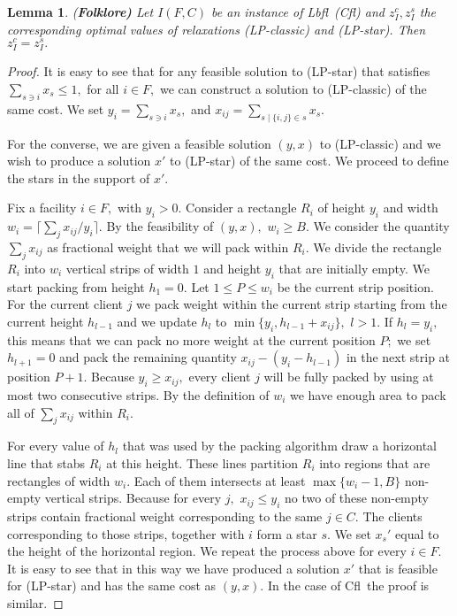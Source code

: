 \documentclass[11pt]{article}\usepackage{amsmath}
\newtheorem{lemma}{Lemma}[section]
\newcommand{\lbfl}{{\sc Lbfl}}
\newcommand{\cfl}{{\sc Cfl}}
\begin{document}
\begin{lemma} {(\bf Folklore)}  \label{lemma:ap-classic}
Let $I(F,C)$ be an instance of \lbfl\ (\cfl\/) and $z_I^c, z_I^s$ the
corresponding optimal values of 
relaxations (LP-classic) and (LP-star). Then $z_I^c = z_I^s.$
\end{lemma}
\begin{proof}
It is easy to see that for any feasible solution to (LP-star) that
satisfies  $\sum_{s \ni i} x_s \leq 1,$ for all $i \in F,$ we can 
construct a solution to (LP-classic) of the same cost. We set $y_i =
\sum_{s \ni i} x_s,$  and $x_{ij} = \sum_{s \mid \{i,j\} \in s} x_s.$ 


For the converse, we are given a feasible solution $(y,x)$ to
(LP-classic) and we wish to produce a solution $x'$ to (LP-star) of
the same cost.  We proceed to define the stars in the support of $x'.$ 

Fix a facility $i \in F,$ with $y_i > 0.$ Consider  a rectangle $R_i$ of height 
$y_i$ and width $w_i= \lceil \sum_j x_{ij}/y_i \rceil.$ By the
feasibility of $(y,x),$ $w_i \geq B.$  We consider  the quantity
$\sum_j x_{ij}$ as fractional weight that we will pack 
within $R_i.$ 
We divide the rectangle $R_i$ into $w_i$ vertical strips of width $1$
and height $y_i$ that are initially
empty.  
We
start packing from height $h_1=0.$ Let $1 \leq P \leq w_i$ be the
current strip position. For the current client
$j$ we pack weight within the current strip   starting from the current height
$h_{l-1}$ and we
update $h_l$ to $\min \{ y_i, h_{l-1} + x_{ij} \},$ $l >1.$ If 
$h_l = y_i,$ this means that we can pack  no more weight   at the
current position $P;$ we set $h_{l+1}=0$ and pack the remaining quantity $x_{ij} - (y_i
- h_{l-1})$ in the next strip at position $P+1.$ Because $y_i \geq
x_{ij},$ every client $j$ will be fully packed by using at most 
two 
consecutive strips. By  the definition of $w_i$ we have enough
area to pack all of $\sum_j x_{ij}$ within $R_i.$ 

For every value of $h_l$ that was used by the packing algorithm   draw a horizontal
line that stabs $R_i$ at this height. These lines partition $R_i$  into
regions that are rectangles of width $w_i.$ 
 Each of them intersects at least $\max \{ w_i -1, B
\}$ non-empty vertical strips. Because for every $j,$ $x_{ij} \leq
y_i$ no two of 
these non-empty strips contain fractional weight corresponding to the  same $j \in C.$ The clients
corresponding to  those strips, together with $i$ form a star $s.$ We
set $x_{s}'$ equal to the height of the horizontal region. 
We repeat the process above for every $i \in F.$ 
It is easy
to see that in this way we have produced a solution $x'$ that is
feasible  for (LP-star) and has the  same cost as $(y,x).$ 
In the case of \cfl\ the proof is similar.
\end{proof} 
\end{document}
